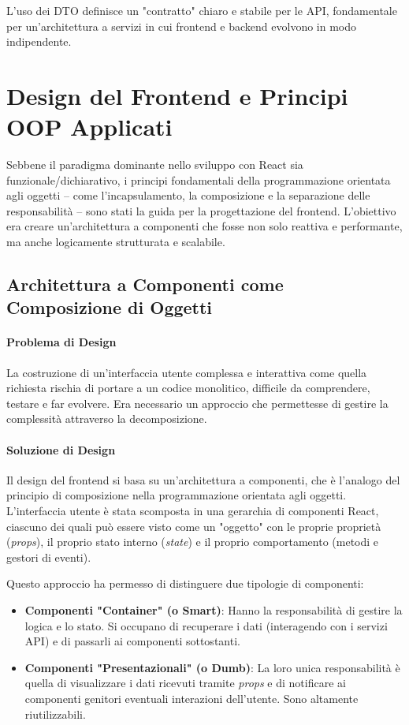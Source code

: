 \documentclass[12pt,a4paper,openright,twoside]{book}
\begin{document}
L'uso dei DTO definisce un "contratto" chiaro e stabile per le API, fondamentale per un'architettura a servizi in cui frontend e backend evolvono in modo indipendente.

\section{Design del Frontend e Principi OOP Applicati}
\label{sec:design_frontend}

Sebbene il paradigma dominante nello sviluppo con React sia funzionale/dichiarativo, i principi fondamentali della programmazione orientata agli oggetti -- come l'incapsulamento, la composizione e la separazione delle responsabilità -- sono stati la guida per la progettazione del frontend. L'obiettivo era creare un'architettura a componenti che fosse non solo reattiva e performante, ma anche logicamente strutturata e scalabile.

\subsection{Architettura a Componenti come Composizione di Oggetti}
\label{subsec:design_component_composition}

\paragraph{Problema di Design}
La costruzione di un'interfaccia utente complessa e interattiva come quella richiesta rischia di portare a un codice monolitico, difficile da comprendere, testare e far evolvere. Era necessario un approccio che permettesse di gestire la complessità attraverso la decomposizione.

\paragraph{Soluzione di Design}
Il design del frontend si basa su un'architettura a componenti, che è l'analogo del principio di composizione nella programmazione orientata agli oggetti. L'interfaccia utente è stata scomposta in una gerarchia di componenti React, ciascuno dei quali può essere visto come un "oggetto" con le proprie proprietà (\textit{props}), il proprio stato interno (\textit{state}) e il proprio comportamento (metodi e gestori di eventi).

Questo approccio ha permesso di distinguere due tipologie di componenti:
\begin{itemize}
    \item \textbf{Componenti "Container" (o Smart)}: Hanno la responsabilità di gestire la logica e lo stato. Si occupano di recuperare i dati (interagendo con i servizi API) e di passarli ai componenti sottostanti.
    \item \textbf{Componenti "Presentazionali" (o Dumb)}: La loro unica responsabilità è quella di visualizzare i dati ricevuti tramite \textit{props} e di notificare ai componenti genitori eventuali interazioni dell'utente. Sono altamente riutilizzabili.
\end{itemize}
\end{document}
